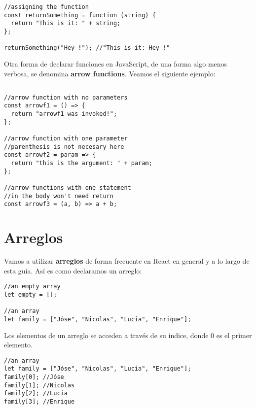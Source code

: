 \documentclass[a4paper, oneside, titlepage, 12pt]{paper}
\begin{document}
\begin{verbatim}
//assigning the function
const returnSomething = function (string) {
  return "This is it: " + string;
};

returnSomething("Hey !"); //"This is it: Hey !"
\end{verbatim}

Otra forma de declarar funciones en JavaScript, de una forma algo menos verbosa, se denomina \textbf{arrow functions}. Veamos el siguiente ejemplo:

\begin{verbatim}
               
//arrow function with no parameters
const arrowf1 = () => {
  return "arrowf1 was invoked!";
};

//arrow function with one parameter
//parenthesis is not necesary here
const arrowf2 = param => {
  return "this is the argument: " + param;
};

//arrow functions with one statement 
//in the body won't need return 
const arrowf3 = (a, b) => a + b;
\end{verbatim}

\section{Arreglos} \label{arrays}

Vamos a utilizar \textbf{arreglos} de forma frecuente en React en general y a lo largo de esta guía. Así es como declaramos un arreglo:

\begin{verbatim}
//an empty array
let empty = [];

//an array
let family = ["Jóse", "Nicolas", "Lucia", "Enrique"];
\end{verbatim}

Los elementos de un arreglo se acceden a través de su índice, donde 0 es el primer elemento.

\begin{verbatim}
//an array
let family = ["Jóse", "Nicolas", "Lucia", "Enrique"];
family[0]; //Jóse
family[1]; //Nicolas
family[2]; //Lucia
family[3]; //Enrique
\end{verbatim}
\end{document}
